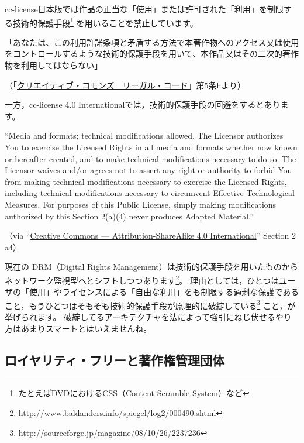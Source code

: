 \documentclass{ltjsarticle}
\renewcommand{\emph}[1]{\textsf{\textgt{#1}}} %
\begin{document}
cc-license日本版では作品の正当な「使用」または許可された「利用」を制限する技術的保護手段\footnote{たとえばDVDにおけるCSS（Content Scramble System）など} を用いることを禁止しています。
\begin{mdframed}
「あなたは、この利用許諾条項と矛盾する方法で本著作物へのアクセス又は使用をコントロールするような技術的保護手段を用いて、本作品又はその二次的著作物を利用してはならない」\par
（「\href{http://creativecommons.org/licenses/by-sa/2.1/jp/legalcode}{クリエイティブ・コモンズ　リーガル・コード}」第5条hより）
\end{mdframed}
一方，cc-license 4.0 Internationalでは，技術的保護手段の回避を\emph{許可}するとあります。
\begin{mdframed}
``Media and formats; technical modifications allowed. The Licensor authorizes You to exercise the Licensed Rights in all media and formats whether now known or hereafter created, and to make technical modifications necessary to do so. The Licensor waives and/or agrees not to assert any right or authority to forbid You from making technical modifications necessary to exercise the Licensed Rights, including technical modifications necessary to circumvent Effective Technological Measures. For purposes of this Public License, simply making modifications authorized by this Section 2(a)(4) never produces Adapted Material.'' \par
（via ``\href{http://creativecommons.org/licenses/by-sa/4.0/legalcode}{Creative Commons — Attribution-ShareAlike 4.0 International}'' Section 2 a4）
\end{mdframed}

現在の DRM（Digital Rights Management）は技術的保護手段を用いたものからネットワーク監視型へとシフトしつつあります\footnote{\url{http://www.baldanders.info/spiegel/log2/000490.shtml}}。
理由としては，ひとつはユーザの「使用」やライセンスによる「自由な利用」をも制限する過剰な保護であること，もうひとつはそもそも技術的保護手段が原理的に破綻している\footnote{\url{http://sourceforge.jp/magazine/08/10/26/2237236}} こと，が挙げられます。
破綻してるアーキテクチャを法によって強引にねじ伏せるやり方はあまりスマートとはいえませんね。


\subsection{ロイヤリティ・フリーと著作権管理団体}
\end{document}
